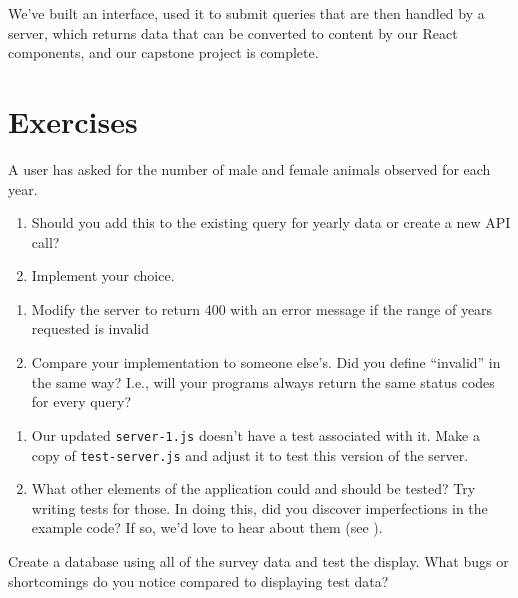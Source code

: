 
We've built an interface,
used it to submit queries that are then handled by a server,
which returns data that can be converted to content by our React components,
and our capstone project is complete.

\section{Exercises}\label{s:capstone-exercises}


A user has asked for the number of male and female animals observed for each year.

\begin{enumerate}
\item
  Should you add this to the existing query for yearly data or create a new API call?
\item
  Implement your choice.
\end{enumerate}


\begin{enumerate}
\item
  Modify the server to return 400 with an error message
  if the range of years requested is invalid
\item
  Compare your implementation to someone else's.
  Did you define ``invalid'' in the same way?
  I.e., will your programs always return the same status codes for every query?
\end{enumerate}


\begin{enumerate}
\item
  Our updated \texttt{server-1.js} doesn't have a test associated with it.
  Make a copy of \texttt{test-server.js} and adjust it to test this version of the
  server.
\item
  What other elements of the application could and should be tested?
  Try writing tests for those.
  In doing this, did you discover imperfections in the example code?
  If so, we'd love to hear about them (see ).
\end{enumerate}


Create a database using all of the survey data and test the display.
What bugs or shortcomings do you notice compared to displaying test data?

